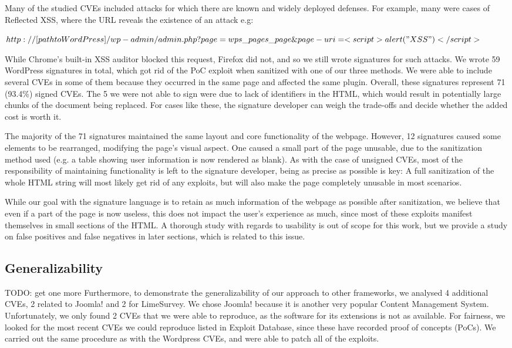 Many of the studied CVEs included attacks for which there are known and widely deployed defenses. For example, many were cases of Reflected XSS, where the URL reveals the existence of an attack e.g:


$http://[path to WordPress]/wp-admin/admin.php?page=wps\_pages\_page\&page-uri=<script>alert("XSS")</script>$

While Chrome's built-in XSS auditor blocked this request, Firefox did not, and so we still wrote signatures for such attacks. We wrote 59 WordPress signatures in total, which got rid of the PoC exploit when sanitized with one of our three methods. We were able to include several CVEs in some of them because they occurred in the same page and affected the same plugin. Overall, these signatures represent 71 (93.4\%) signed CVEs. The 5 we were not able to sign were due to lack of identifiers in the HTML, which would result in potentially large chunks of the document being replaced. For cases like these, the signature developer can weigh the trade-offs and decide whether the added cost is worth it.

The majority of the 71 signatures maintained the same layout and core functionality of the webpage. However, 12 signatures caused some elements to be rearranged, modifying the page's visual aspect. One caused a small part of the page unusable, due to the sanitization method used (e.g. a table showing user information is now rendered as blank). As with the case of unsigned CVEs, most of the responsibility of maintaining functionality is left to the signature developer, being as precise as possible is key: A full sanitization of the whole HTML string will most likely get rid of any exploits, but will also make the page completely unusable in most scenarios.

While our goal with the signature language is to retain as much information of the webpage as possible after sanitization, we believe that even if a part of the page is now useless, this does not impact the user's experience as much, since most of these exploits manifest themselves in small sections of the HTML. A thorough study with regards to usability is out of scope for this work, but we provide a study on false positives and false negatives in later sections, which is related to this issue.

\subsection{Generalizability}
TODO: get one more
Furthermore, to demonstrate the generalizability of our approach to other frameworks, we analysed 4 additional CVEs, 2 related to Joomla! and 2 for LimeSurvey. We chose Joomla! because it is another very popular Content Management System. Unfortunately, we only found 2 CVEs that we were able to reproduce, as the software for its extensions is not as available. For fairness, we looked for the most recent CVEs we could reproduce listed in Exploit Database, since these have recorded proof of concepts (PoCs). We carried out the same procedure as with the Wordpress CVEs, and were able to patch all of the exploits. 

